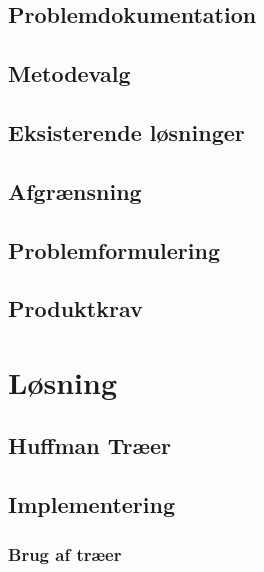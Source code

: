 \documentclass[12pt]{report}
\begin{document}
	\section{Problemdokumentation}
	
	
	\section{Metodevalg}
	

	\section{Eksisterende løsninger}
	

	\section{Afgrænsning}
	

	\section{Problemformulering}
		
	
	\section{Produktkrav}
	
	



\chapter{Løsning}

	\section{Huffman Træer}
	\label{huffman_traer}
	

	\section{Implementering}
	
	\subsection{Brug af træer}
	   
   
\end{document}
